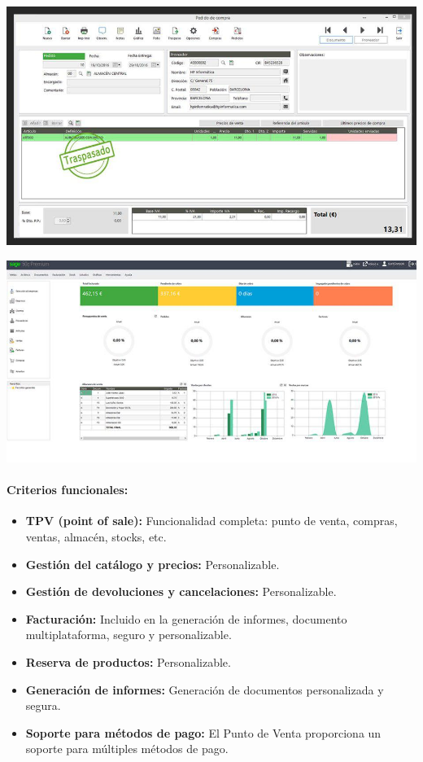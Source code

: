\documentclass{article}
\begin{document}
\begin{flushleft}
	\includegraphics[scale=0.5]{imagenes/sage50.jpg} 
\end{flushleft}	

\begin{flushleft}
	\includegraphics[scale=0.75]{imagenes/sage50_2.jpg} 
\end{flushleft}

\paragraph{Criterios funcionales:}

\begin{itemize}

	\item \textbf{TPV (point of sale):} Funcionalidad completa: punto de venta, compras, ventas, almacén, stocks, etc. 
	\item \textbf{Gestión del catálogo y precios:} Personalizable.
	\item \textbf{Gestión de devoluciones y cancelaciones:} Personalizable.
	\item \textbf{Facturación:} Incluido en la generación de informes, documento multiplataforma, seguro y personalizable. 
	\item \textbf{Reserva de productos:} Personalizable.
	\item \textbf{Generación de informes:} Generación de documentos personalizada y segura.
	\item \textbf{Soporte para métodos de pago:} El Punto de Venta proporciona un soporte para múltiples métodos de pago.

\end{itemize}
\end{document}
